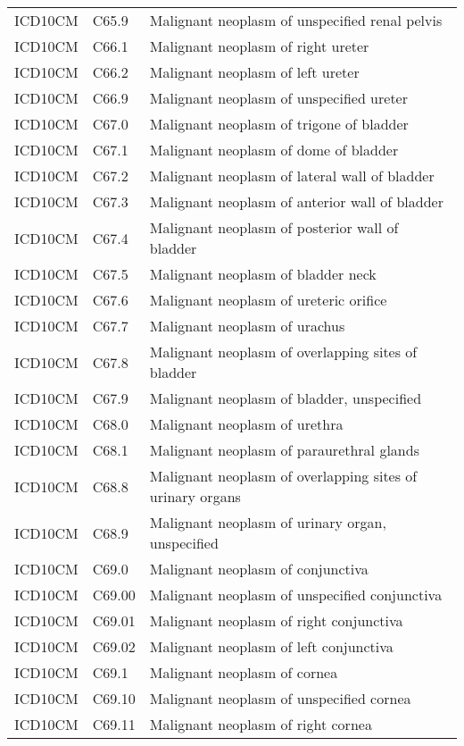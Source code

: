 \begin{longtable}{p{}p{}p{}}
  ICD10CM & C65.9 & Malignant neoplasm of unspecified renal pelvis \\ 
  ICD10CM & C66.1 & Malignant neoplasm of right ureter \\ 
  ICD10CM & C66.2 & Malignant neoplasm of left ureter \\ 
  ICD10CM & C66.9 & Malignant neoplasm of unspecified ureter \\ 
  ICD10CM & C67.0 & Malignant neoplasm of trigone of bladder \\ 
  ICD10CM & C67.1 & Malignant neoplasm of dome of bladder \\ 
  ICD10CM & C67.2 & Malignant neoplasm of lateral wall of bladder \\ 
  ICD10CM & C67.3 & Malignant neoplasm of anterior wall of bladder \\ 
  ICD10CM & C67.4 & Malignant neoplasm of posterior wall of bladder \\ 
  ICD10CM & C67.5 & Malignant neoplasm of bladder neck \\ 
  ICD10CM & C67.6 & Malignant neoplasm of ureteric orifice \\ 
  ICD10CM & C67.7 & Malignant neoplasm of urachus \\ 
  ICD10CM & C67.8 & Malignant neoplasm of overlapping sites of bladder \\ 
  ICD10CM & C67.9 & Malignant neoplasm of bladder, unspecified \\ 
  ICD10CM & C68.0 & Malignant neoplasm of urethra \\ 
  ICD10CM & C68.1 & Malignant neoplasm of paraurethral glands \\ 
  ICD10CM & C68.8 & Malignant neoplasm of overlapping sites of urinary organs \\ 
  ICD10CM & C68.9 & Malignant neoplasm of urinary organ, unspecified \\ 
  ICD10CM & C69.0 & Malignant neoplasm of conjunctiva \\ 
  ICD10CM & C69.00 & Malignant neoplasm of unspecified conjunctiva \\ 
  ICD10CM & C69.01 & Malignant neoplasm of right conjunctiva \\ 
  ICD10CM & C69.02 & Malignant neoplasm of left conjunctiva \\ 
  ICD10CM & C69.1 & Malignant neoplasm of cornea \\ 
  ICD10CM & C69.10 & Malignant neoplasm of unspecified cornea \\ 
  ICD10CM & C69.11 & Malignant neoplasm of right cornea \\ 

\end{longtable}
